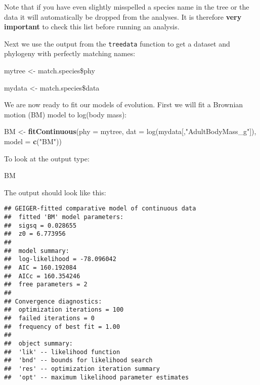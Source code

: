 \documentclass[11pt]{article}
\newcommand{\KeywordTok}[1]{\textcolor[rgb]{0.13,0.29,0.53}{\textbf{{#1}}}}
\newcommand{\DataTypeTok}[1]{\textcolor[rgb]{0.13,0.29,0.53}{{#1}}}
\newcommand{\CharTok}[1]{\textcolor[rgb]{0.31,0.60,0.02}{{#1}}}
\newcommand{\StringTok}[1]{\textcolor[rgb]{0.31,0.60,0.02}{{#1}}}
\newcommand{\NormalTok}[1]{{#1}}
\begin{document}
\begin{framed}
Note that if you have even slightly misspelled a species name in the tree or the data it will automatically be dropped from the analyses. It is therefore \textbf{very important} to check this list before running an analysis.
\end{framed}

Next we use the output from the \texttt{treedata} function to get a dataset and phylogeny with perfectly matching names:

\begin{snugshade}
\begin{Highlighting}[]
\NormalTok{mytree <-}\StringTok{ }\NormalTok{match.species\$phy}

\NormalTok{mydata <-}\StringTok{ }\NormalTok{match.species\$data}
\end{Highlighting}
\end{snugshade}

We are now ready to fit our models of evolution. First we will fit a Brownian motion (BM) model to log(body mass):

\begin{snugshade}
\begin{Highlighting}[]
\NormalTok{BM <-}\StringTok{ }\KeywordTok{fitContinuous}\NormalTok{(\DataTypeTok{phy = }mytree, \DataTypeTok{dat = }log(mydata[,"AdultBodyMass_g"]),} 
                    \DataTypeTok{model = }\KeywordTok{c}\NormalTok{(}\StringTok{"}\CharTok{BM}\StringTok{"}\NormalTok{))}
\end{Highlighting}
\end{snugshade}

To look at the output type:

\begin{snugshade}
\begin{Highlighting}[]
\NormalTok{BM}
\end{Highlighting}
\end{snugshade}

The output should look like this:

\begin{verbatim}
## GEIGER-fitted comparative model of continuous data
##  fitted 'BM' model parameters:
##  sigsq = 0.028655
##  z0 = 6.773956
## 
##  model summary:
##  log-likelihood = -78.096042
##  AIC = 160.192084
##  AICc = 160.354246
##  free parameters = 2
## 
## Convergence diagnostics:
##  optimization iterations = 100
##  failed iterations = 0
##  frequency of best fit = 1.00
## 
##  object summary:
##  'lik' -- likelihood function
##  'bnd' -- bounds for likelihood search
##  'res' -- optimization iteration summary
##  'opt' -- maximum likelihood parameter estimates
\end{verbatim}
\end{document}
